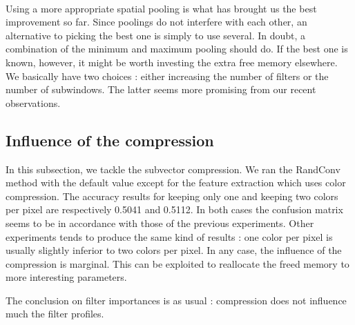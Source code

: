 \documentclass[a4paper]{report}
\begin{document}
	
	\paragraph{}
	Using a more appropriate spatial pooling is what has brought us the best improvement so far. Since poolings do not interfere with each other, an alternative to picking the best one is simply to use several. In doubt, a combination of the minimum and maximum pooling should do. If the best one is known, however, it might be worth investing the extra free memory elsewhere. We basically have two choices : either increasing the number of filters or the number of subwindows. The latter seems more promising from our recent observations.
	
	
	
	\subsection{Influence of the compression}
	In this subsection, we tackle the subvector compression. We ran the RandConv method with the default value except for the feature extraction which uses color compression. The accuracy results for keeping only one and keeping two colors per pixel are respectively 0.5041 and 0.5112. In both cases the confusion matrix seems to be in accordance with those of the previous experiments. Other experiments tends to produce the same kind of results : one color per pixel is usually slightly inferior to two colors per pixel. In any case, the influence of the compression is marginal. This can be exploited to reallocate the freed memory to more interesting parameters.
	\par
	The conclusion on filter importances is as usual : compression does not influence much the filter profiles.
	
\end{document}
